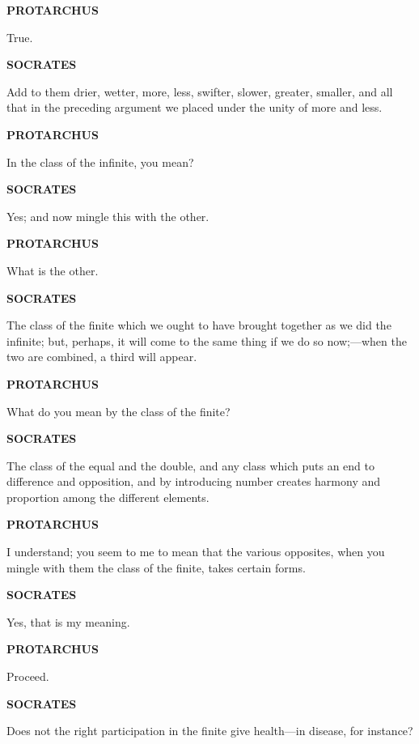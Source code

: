\documentclass[11pt,letter]{article}
\begin{document}
\par \textbf{PROTARCHUS}
\par   True.

\par \textbf{SOCRATES}
\par   Add to them drier, wetter, more, less, swifter, slower, greater, smaller, and all that in the preceding argument we placed under the unity of more and less.

\par \textbf{PROTARCHUS}
\par   In the class of the infinite, you mean?

\par \textbf{SOCRATES}
\par   Yes; and now mingle this with the other.

\par \textbf{PROTARCHUS}
\par   What is the other.

\par \textbf{SOCRATES}
\par   The class of the finite which we ought to have brought together as we did the infinite; but, perhaps, it will come to the same thing if we do so now;—when the two are combined, a third will appear.

\par \textbf{PROTARCHUS}
\par   What do you mean by the class of the finite?

\par \textbf{SOCRATES}
\par   The class of the equal and the double, and any class which puts an end to difference and opposition, and by introducing number creates harmony and proportion among the different elements.

\par \textbf{PROTARCHUS}
\par   I understand; you seem to me to mean that the various opposites, when you mingle with them the class of the finite, takes certain forms.

\par \textbf{SOCRATES}
\par   Yes, that is my meaning.

\par \textbf{PROTARCHUS}
\par   Proceed.

\par \textbf{SOCRATES}
\par   Does not the right participation in the finite give health—in disease, for instance?
\end{document}
